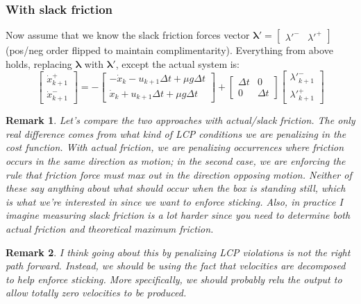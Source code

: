 \documentclass{article}
\newtheorem{remark}{Remark}
\renewcommand{\vec}[1]{\boldsymbol{#1}}
\newcommand{\rvec}[1]{\begin{bmatrix} #1 \end{bmatrix}}
\begin{document}
\subsubsection{With slack friction}
Now assume that we know the slack friction forces vector $\vec{\lambda'} = \rvec{\lambda'^- & \lambda'^+}$ (pos/neg order flipped to maintain complimentarity). Everything from above holds, replacing $\vec{\lambda}$ with $\vec{\lambda'}$, except the actual system is:
\[
    \begin{bmatrix}
        \dot x ^+_{k+1} \\
        \dot x ^-_{k+1}
    \end{bmatrix}
    =
    -
    \begin{bmatrix}
        - \dot x_k - u_{k+1} \Delta t + \mu g \Delta t \\
        \dot x_k + u_{k+1} \Delta t + \mu g \Delta t  
    \end{bmatrix}
    +
    \begin{bmatrix}
        \Delta t & 0 \\
        0 & \Delta t
    \end{bmatrix}
    \begin{bmatrix}
        \lambda '^-_{k+1} \\
        \lambda '^+_{k+1}
    \end{bmatrix}
\]

\begin{remark}
    Let's compare the two approaches with actual/slack friction. The only real difference comes from what kind of LCP conditions we are penalizing in the cost function. With actual friction, we are penalizing occurrences where friction occurs in the same direction as motion; in the second case, we are enforcing the rule that friction force must max out in the direction opposing motion. Neither of these say anything about what should occur when the box is standing still, which is what we're interested in since we want to enforce sticking. Also, in practice I imagine measuring slack friction is a lot harder since you need to determine both actual friction and theoretical maximum friction.
\end{remark}

\begin{remark}
    I think going about this by penalizing LCP violations is not the right path forward. Instead, we should be using the fact that velocities are decomposed to help enforce sticking. More specifically, we should probably relu the output to allow totally zero velocities to be produced.
\end{remark}
\end{document}
